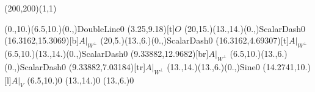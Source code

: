 \unitlength=1bp%

\begin{feynartspicture}(200,200)(1,1)

\FADiagram{}
\FAProp(0.,10.)(6.5,10.)(0.,){DoubleLine}{0}
\FALabel(3.25,9.18)[t]{$O$}
\FAProp(20,15.)(13.,14.)(0.,){ScalarDash}{0}
\FALabel(16.3162,15.3069)[b]{$A|_{W^\perp}$}
\FAProp(20,5.)(13.,6.)(0.,){ScalarDash}{0}
\FALabel(16.3162,4.69307)[t]{$A|_{W^\perp}$}
\FAProp(6.5,10.)(13.,14.)(0.,){ScalarDash}{0}
\FALabel(9.33882,12.9682)[br]{$A|_{W^\perp}$}
\FAProp(6.5,10.)(13.,6.)(0.,){ScalarDash}{0}
\FALabel(9.33882,7.03184)[tr]{$A|_{W^\perp}$}
\FAProp(13.,14.)(13.,6.)(0.,){Sine}{0}
\FALabel(14.2741,10.)[l]{$A|_V$}
\FAVert(6.5,10.){0}
\FAVert(13.,14.){0}
\FAVert(13.,6.){0}
\end{feynartspicture}


